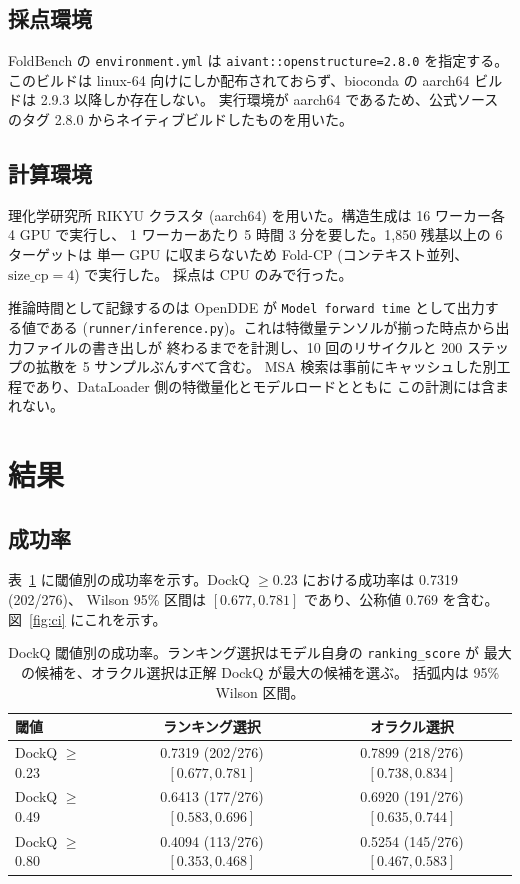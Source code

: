 \documentclass[11pt,a4paper]{article}
\begin{document}
\subsection{採点環境}

FoldBench の \texttt{environment.yml} は \texttt{aivant::openstructure=2.8.0} を指定する。
このビルドは linux-64 向けにしか配布されておらず、bioconda の aarch64 ビルドは 2.9.3 以降しか存在しない。
実行環境が aarch64 であるため、公式ソースのタグ 2.8.0 からネイティブビルドしたものを用いた。

\subsection{計算環境}

理化学研究所 RIKYU クラスタ (aarch64) を用いた。構造生成は 16 ワーカー各 4 GPU で実行し、
1 ワーカーあたり 5 時間 3 分を要した。1,850 残基以上の 6 ターゲットは
単一 GPU に収まらないため Fold-CP (コンテキスト並列、$\mathrm{size\_cp}=4$) で実行した。
採点は CPU のみで行った。

推論時間として記録するのは OpenDDE が \texttt{Model forward time} として出力する値である
(\texttt{runner/inference.py})。これは特徴量テンソルが揃った時点から出力ファイルの書き出しが
終わるまでを計測し、10 回のリサイクルと 200 ステップの拡散を 5 サンプルぶんすべて含む。
MSA 検索は事前にキャッシュした別工程であり、DataLoader 側の特徴量化とモデルロードとともに
この計測には含まれない。

\section{結果}

\subsection{成功率}

表~\ref{tab:rates} に閾値別の成功率を示す。DockQ $\geq 0.23$ における成功率は 0.7319 (202/276)、
Wilson 95\% 区間は $[0.677, 0.781]$ であり、公称値 0.769 を含む。
図~\ref{fig:ci} にこれを示す。

\begin{table}[htbp]
\centering
\caption{DockQ 閾値別の成功率。ランキング選択はモデル自身の \texttt{ranking\_score} が
最大の候補を、オラクル選択は正解 DockQ が最大の候補を選ぶ。
括弧内は 95\% Wilson 区間。}
\label{tab:rates}
\begin{tabular}{lcc}
\toprule
閾値 & ランキング選択 & オラクル選択 \\
\midrule
DockQ $\geq$ 0.23 & 0.7319 (202/276) $[0.677, 0.781]$ & 0.7899 (218/276) $[0.738, 0.834]$ \\
DockQ $\geq$ 0.49 & 0.6413 (177/276) $[0.583, 0.696]$ & 0.6920 (191/276) $[0.635, 0.744]$ \\
DockQ $\geq$ 0.80 & 0.4094 (113/276) $[0.353, 0.468]$ & 0.5254 (145/276) $[0.467, 0.583]$ \\
\bottomrule
\end{tabular}
\end{table}
\end{document}
